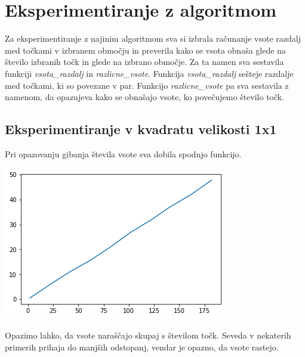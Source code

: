 \documentclass[12pt, a4paper]{article}
\begin{document}
\pagebreak
\section{Eksperimentiranje z algoritmom}
Za eksperimentiranje z najinim algoritmom sva si izbrala računanje vsote razdalj med točkami v izbranem območju in preverila kako se vsota obnaša glede na število izbranih točk in glede na izbrano območje. Za ta namen sva sestavila funkciji \textit{vsota_razdalj} in \textit{razlicne_vsote}. Funkcija  \textit{vsota_razdalj} sešteje razdalje med točkami, ki so povezane v par. Funkcijo \textit{razlicne_vsote} pa sva sestavila z namenom, da opazujeva kako se obnašajo vsote, ko povečujemo število točk. \\

\subsection{Eksperimentiranje v kvadratu velikosti 1x1}
Pri opazovanju gibanja števila vsote sva dobila spodnjo funkcijo.\\
\begin{center}
\includegraphics{kvadrat_1x1.png}
\end{center}
Opazimo lahko, da vsote naraščajo skupaj s številom točk. Seveda v nekaterih primerih prihaja do manjših odstopanj, vendar je opazno, da vsote rastejo.

\newpage
\end{document}
